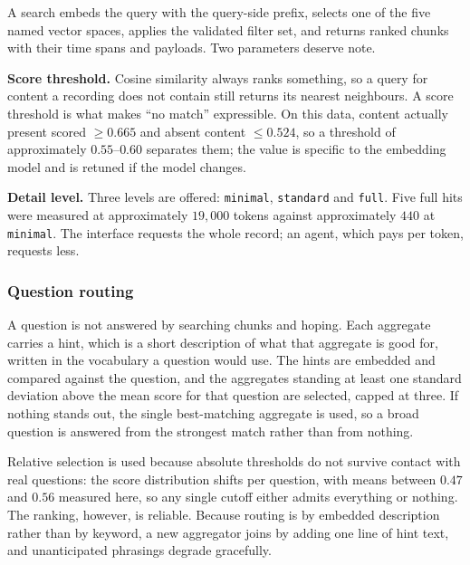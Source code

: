 A search embeds the query with the query-side prefix, selects one of the five named
vector spaces, applies the validated filter set, and returns ranked chunks with their
time spans and payloads. Two parameters deserve note.

\textbf{Score threshold.} Cosine similarity always ranks something, so a query for content
a recording does not contain still returns its nearest neighbours. A score threshold is
what makes ``no match'' expressible. On this data, content actually present scored
$\geq 0.665$ and absent content $\leq 0.524$, so a threshold of approximately
$0.55$--$0.60$ separates them; the value is specific to the embedding model and is
retuned if the model changes.

\textbf{Detail level.} Three levels are offered: \texttt{minimal}, \texttt{standard}
and \texttt{full}. Five full hits were measured at approximately $19{,}000$ tokens
against approximately $440$ at \texttt{minimal}. The interface requests the whole
record; an agent, which pays per token, requests less.

\subsubsection*{Question routing}

A question is not answered by searching chunks and hoping. Each aggregate carries a
hint, which is a short description of what that aggregate is good for, written in the
vocabulary a question would use. The hints are embedded and compared against the question,
and the aggregates standing at least one standard deviation above the mean score for
that question are selected, capped at three. If nothing stands out, the single
best-matching aggregate is used, so a broad question is answered from the strongest
match rather than from nothing.

Relative selection is used because absolute thresholds do not survive contact with real
questions: the score distribution shifts per question, with means between $0.47$ and
$0.56$ measured here, so any single cutoff either admits everything or nothing. The
ranking, however, is reliable. Because routing is by embedded description rather than by
keyword, a new aggregator joins by adding one line of hint text, and unanticipated
phrasings degrade gracefully.

